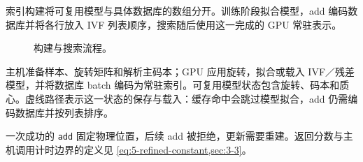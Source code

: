 索引构建将可复用模型与具体数据库的数组分开。训练阶段拟合模型，add 编码数据库并将各行放入 IVF 列表顺序，搜索随后使用这一完成的 GPU 常驻表示。

\begin{figure}[!htbp]
\centering
\resizebox{\linewidth}{!}{}
\caption[构建与搜索流程]{构建与搜索流程。}
\label{fig:4-architecture}
\end{figure}

主机准备样本、旋转矩阵和解析主码本；GPU 应用旋转，拟合或载入 IVF／残差模型，并将数据库 batch 编码为常驻索引。可复用模型状态包含旋转、码本和质心。虚线路径表示这一状态的保存与载入：缓存命中会跳过模型拟合，add 仍需编码数据库并按列表排序。

一次成功的 \texttt{add} 固定物理位置，后续 add 被拒绝，更新需要重建。返回分数与主机调用计时边界的定义见 \cref{eq:5-refined-constant,sec:3-3}。
